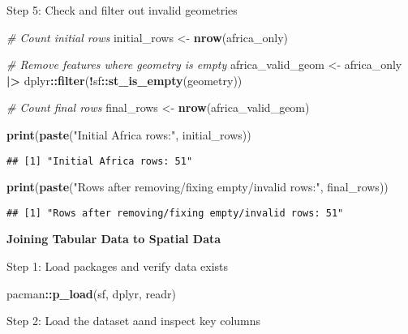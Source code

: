 \documentclass[
]{article}
\newenvironment{Shaded}{\begin{snugshade}}{\end{snugshade}}
\newcommand{\CommentTok}[1]{\textcolor[rgb]{0.56,0.35,0.01}{\textit{#1}}}
\newcommand{\FunctionTok}[1]{\textcolor[rgb]{0.13,0.29,0.53}{\textbf{#1}}}
\newcommand{\NormalTok}[1]{#1}
\newcommand{\OtherTok}[1]{\textcolor[rgb]{0.56,0.35,0.01}{#1}}
\newcommand{\SpecialCharTok}[1]{\textcolor[rgb]{0.81,0.36,0.00}{\textbf{#1}}}
\newcommand{\StringTok}[1]{\textcolor[rgb]{0.31,0.60,0.02}{#1}}
\begin{document}
Step 5: Check and filter out invalid geometries

\begin{Shaded}
\begin{Highlighting}[]
\CommentTok{\# Count initial rows}
\NormalTok{initial\_rows }\OtherTok{\textless{}{-}} \FunctionTok{nrow}\NormalTok{(africa\_only)}

\CommentTok{\# Remove features where geometry is empty}
\NormalTok{africa\_valid\_geom }\OtherTok{\textless{}{-}}\NormalTok{ africa\_only }\SpecialCharTok{|\textgreater{}} 
\NormalTok{  dplyr}\SpecialCharTok{::}\FunctionTok{filter}\NormalTok{(}\SpecialCharTok{!}\NormalTok{sf}\SpecialCharTok{::}\FunctionTok{st\_is\_empty}\NormalTok{(geometry))}

\CommentTok{\# Count final rows}
\NormalTok{final\_rows }\OtherTok{\textless{}{-}} \FunctionTok{nrow}\NormalTok{(africa\_valid\_geom)}

\FunctionTok{print}\NormalTok{(}\FunctionTok{paste}\NormalTok{(}\StringTok{"Initial Africa rows:"}\NormalTok{, initial\_rows))}
\end{Highlighting}
\end{Shaded}

\begin{verbatim}
## [1] "Initial Africa rows: 51"
\end{verbatim}

\begin{Shaded}
\begin{Highlighting}[]
\FunctionTok{print}\NormalTok{(}\FunctionTok{paste}\NormalTok{(}\StringTok{"Rows after removing/fixing empty/invalid rows:"}\NormalTok{, final\_rows))}
\end{Highlighting}
\end{Shaded}

\begin{verbatim}
## [1] "Rows after removing/fixing empty/invalid rows: 51"
\end{verbatim}

\textbf{Joining Tabular Data to Spatial Data}

Step 1: Load packages and verify data exists

\begin{Shaded}
\begin{Highlighting}[]
\NormalTok{pacman}\SpecialCharTok{::}\FunctionTok{p\_load}\NormalTok{(sf, dplyr, readr)}
\end{Highlighting}
\end{Shaded}

Step 2: Load the dataset aand inspect key columns
\end{document}
